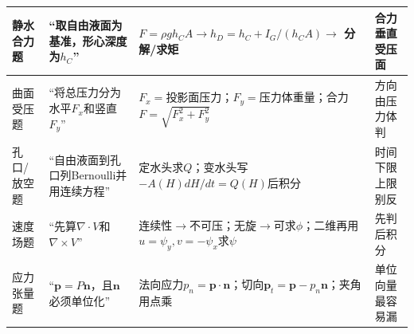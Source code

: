 \documentclass[UTF8,a4paper]{ctexart}
\begin{document}
\begin{tabular}{|L{0.16\textwidth}|L{0.25\textwidth}|L{0.36\textwidth}|L{0.18\textwidth}|}\hline
静水合力题 & “取自由液面为基准，形心深度为$h_C$” & $F=\rho gh_CA\to h_D=h_C+I_G/(h_CA)\to$ 分解/求矩 & 合力垂直受压面\\\hline
曲面受压题 & “将总压力分为水平$F_x$和竖直$F_y$” & $F_x=$投影面压力；$F_y=$压力体重量；合力$F=\sqrt{F_x^2+F_y^2}$ & 方向由压力体判\\\hline
孔口/放空题 & “自由液面到孔口列Bernoulli并用连续方程” & 定水头求$Q$；变水头写$-A(H)dH/dt=Q(H)$后积分 & 时间下限上限别反\\\hline
速度场题 & “先算$\nabla\cdot V$和$\nabla\times V$” & 连续性$\to$不可压；无旋$\to$可求$\phi$；二维再用$u=\psi_y,v=-\psi_x$求$\psi$ & 先判后积分\\\hline
应力张量题 & “$\bm p=P\bm n$，且$\bm n$必须单位化” & 法向应力$p_n=\bm p\cdot\bm n$；切向$\bm p_t=\bm p-p_n\bm n$；夹角用点乘 & 单位向量最容易漏\\\hline
\end{tabular}
\newpage
\end{document}
